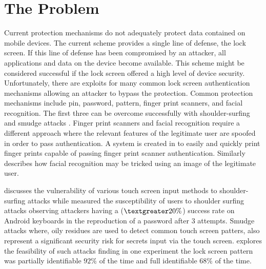 \section{The Problem}
\label{the_problem}
Current protection mechanisms do not adequately protect
data contained on mobile devices.
The current scheme provides a single line of defense,
the lock screen.
If this line of defense has been compromised
by an attacker,
all applications and data on the device become available.
%
This scheme might be considered successful 
if the lock screen offered a high level of device security.
Unfortunately, there are exploits for many common lock screen 
authentication mechanisms 
allowing an attacker to bypass the protection.
%
Common protection mechanisms include
pin, password, pattern, finger print scanners, and facial recognition.
%
The first three can be overcome successfully with 
shoulder-surfing \cite{schaub2012password} and smudge attacks \cite{aviv2010smudge}.
Finger print scanners and facial recognition require a different approach
where the relevant features of the legitimate user are spoofed
in order to pass authentication.
%
A system is created in \cite{cao2016hacking} 
to easily and quickly print finger prints
capable of passing finger print scanner authentication.
%
Similarly \cite{de2013can} describes how
facial recognition may be tricked using an image of the legitimate user.


\cite{schaub2012password} discusses the vulnerability of
various touch screen input methods to shoulder-surfing attacks
while
\cite{hafiz2008towards} measured the susceptibility of 
users to shoulder surfing attacks observing
attackers having a ($\textgreater20\%$) success rate
on Android keyboards
in the reproduction of a password after $3$ attempts.
%
Smudge attacks where,
oily residues are used to detect common touch screen patters,
also represent a significant security risk
for secrets input via the touch screen.
\cite{aviv2010smudge} explores the feasibility of
such attacks finding in one experiment
the lock screen pattern was partially identifiable $92\%$ of the time
and full identifiable $68\%$ of the time.

